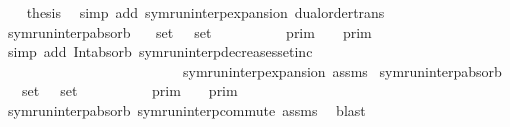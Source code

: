 \begin{isabellebody}
\isanewline
\ \ \isamarkupfalse%
\ {\isacharquery}thesis\ \isamarkupfalse%
\ {\isacharparenleft}simp\ add{\isacharcolon}\ symrun{\isacharunderscore}interp{\isacharunderscore}expansion\ dual{\isacharunderscore}order{\isachardot}trans{\isacharparenright}\isanewline
{}\isamarkupfalse%
%
\endisatagproof
{\isafoldproof}%
%
\isadelimproof
\isanewline
%
\endisadelimproof
\isanewline
{}\isamarkupfalse%
\ symrun{\isacharunderscore}interp{\isacharunderscore}absorb{}{\isacharcolon}\isanewline
\ \ \ {\isacartoucheopen}set\ {\isasymGamma}\ {\isasymsubseteq}\ set\ {\isasymGamma}\isanewline
\ \ \ \ \ {\isacartoucheopen}{\isasymlbrakk}{\isasymlbrakk}\ {\isasymGamma}\ {\isacharat}\ {\isasymGamma}\ {\isasymrbrakk}{\isasymrbrakk}\isactrlsub p\isactrlsub r\isactrlsub i\isactrlsub m\ {\isacharequal}\ {\isasymlbrakk}{\isasymlbrakk}\ {\isasymGamma}\ {\isasymrbrakk}{\isasymrbrakk}\isactrlsub p\isactrlsub r\isactrlsub i\isactrlsub m{\isacartoucheclose}\isanewline
%
\isadelimproof
%
\endisadelimproof
%
\isatagproof
{}\isamarkupfalse%
\ {\isacharparenleft}simp\ add{\isacharcolon}\ Int{\isacharunderscore}absorb{}\ symrun{\isacharunderscore}interp{\isacharunderscore}decreases{\isacharunderscore}setinc\isanewline
\ \ \ \ \ \ \ \ \ \ \ \ \ \ \ \ \ \ \ \ \ \ \ \ \ \ symrun{\isacharunderscore}interp{\isacharunderscore}expansion\ assms{\isacharparenright}%
\endisatagproof
{\isafoldproof}%
%
\isadelimproof
\isanewline
%
\endisadelimproof
\isanewline
{}\isamarkupfalse%
\ symrun{\isacharunderscore}interp{\isacharunderscore}absorb{}{\isacharcolon}\isanewline
\ \ \ {\isacartoucheopen}set\ {\isasymGamma}\ {\isasymsubseteq}\ set\ {\isasymGamma}\isanewline
\ \ \ \ \ {\isacartoucheopen}{\isasymlbrakk}{\isasymlbrakk}\ {\isasymGamma}\ {\isacharat}\ {\isasymGamma}\ {\isasymrbrakk}{\isasymrbrakk}\isactrlsub p\isactrlsub r\isactrlsub i\isactrlsub m\ {\isacharequal}\ {\isasymlbrakk}{\isasymlbrakk}\ {\isasymGamma}\ {\isasymrbrakk}{\isasymrbrakk}\isactrlsub p\isactrlsub r\isactrlsub i\isactrlsub m{\isacartoucheclose}\isanewline
%
\isadelimproof
%
\endisadelimproof
%
\isatagproof
{}\isamarkupfalse%
\ symrun{\isacharunderscore}interp{\isacharunderscore}absorb{}\ symrun{\isacharunderscore}interp{\isacharunderscore}commute\ assms\ \isamarkupfalse%
\ blast%
\endisatagproof
{\isafoldproof}%
%
\isadelimproof
\isanewline
%
\endisadelimproof
%
\isadelimtheory
\isanewline
%
\endisadelimtheory
%
\isatagtheory
{}\isamarkupfalse%
%
\endisatagtheory
{\isafoldtheory}%
%
\isadelimtheory
%
\endisadelimtheory
%
\end{isabellebody}%
